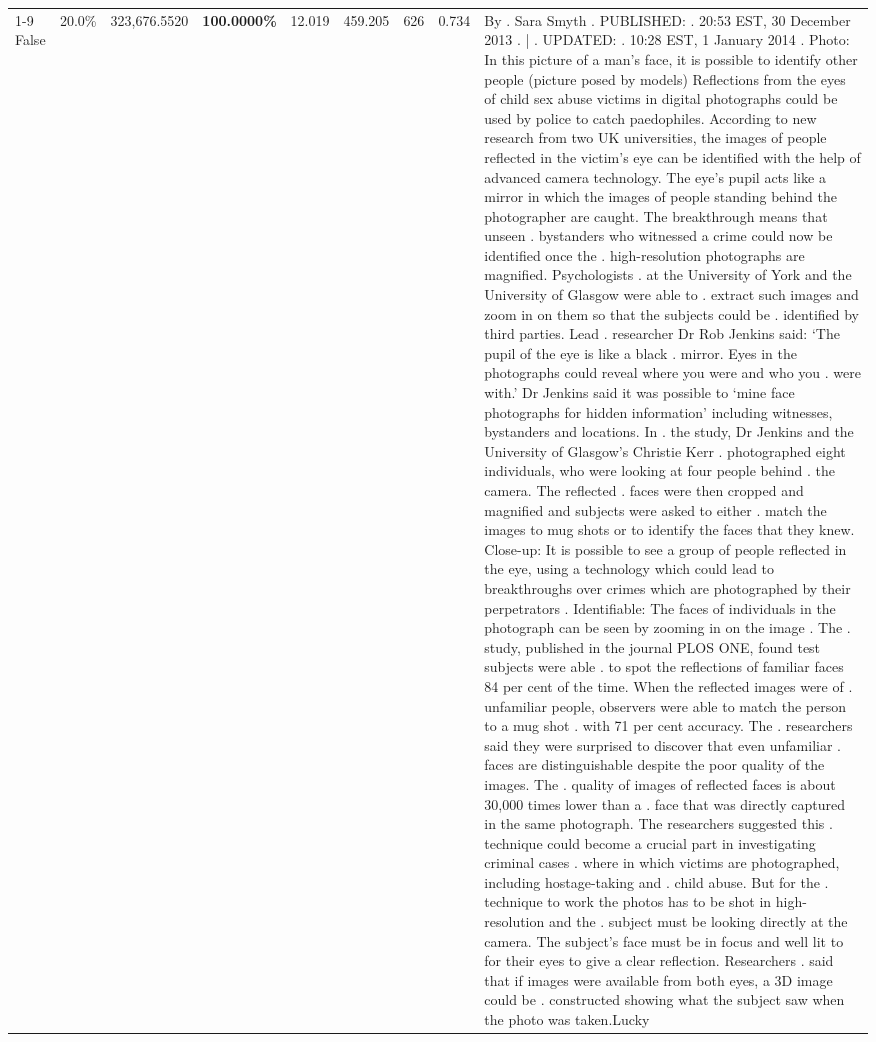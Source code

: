 \begin{table}[H]
\begin{tabular}{lllrlllll}
\cline{1-9}
False & 20.0\% & 323,676.5520 & \bfseries \color{red} 100.0000\% & 12.019 & 459.205 & 626 & 0.734 & By . Sara Smyth . PUBLISHED: . 20:53 EST, 30 December 2013 . | . UPDATED: . 10:28 EST, 1 January 2014 . Photo: In this picture of a man's face, it is possible to identify other people (picture posed by models) Reflections from the eyes of child sex abuse victims in digital photographs could be used by police to catch paedophiles. According to new research from two UK universities, the images of people reflected in the victim's eye can be identified with the help of advanced camera technology. The eye's pupil acts like a mirror in which the images of people standing behind the photographer are caught. The breakthrough means that unseen . bystanders who witnessed a crime could now be identified once the . high-resolution photographs are magnified. Psychologists . at the University of York and the University of Glasgow were able to . extract such images and zoom in on them so that the subjects could be . identified by third parties. Lead . researcher Dr Rob Jenkins said: ‘The pupil of the eye is like a black . mirror. Eyes in the photographs could reveal where you were and who you . were with.' Dr Jenkins said it was possible to ‘mine face photographs for hidden information' including witnesses, bystanders and locations. In . the study, Dr Jenkins and the University of Glasgow's Christie Kerr . photographed eight individuals, who were looking at four people behind . the camera. The reflected . faces were then cropped and magnified and subjects were asked to either . match the images to mug shots or to identify the faces that they knew. Close-up: It is possible to see a group of people reflected in the eye, using a technology which could lead to breakthroughs over crimes which are photographed by their perpetrators . Identifiable: The faces of individuals in the photograph can be seen by zooming in on the image . The . study, published in the journal PLOS ONE, found test subjects were able . to spot the reflections of familiar faces 84 per cent of the time. When the reflected images were of . unfamiliar people, observers were able to match the person to a mug shot . with 71 per cent accuracy. The . researchers said they were surprised to discover that even unfamiliar . faces are distinguishable despite the poor quality of the images. The . quality of images of reflected faces is about 30,000 times lower than a . face that was directly captured in the same photograph. The researchers suggested this . technique could become a crucial part in investigating criminal cases . where in which victims are photographed, including hostage-taking and . child abuse. But for the . technique to work the photos has to be shot in high-resolution and the . subject must be looking directly at the camera. The subject's face must be in focus and well lit to for their eyes to give a clear reflection. Researchers . said that if images were available from both eyes, a 3D image could be . constructed showing what the subject saw when the photo was taken.Lucky \\

\end{tabular}
\end{table}
